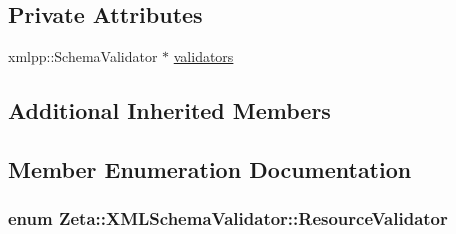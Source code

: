 \subsection*{Private Attributes}
\begin{DoxyCompactItemize}
\item 
xmlpp\+::\+Schema\+Validator $\ast$ \hyperlink{classZeta_1_1XMLSchemaValidator_a6d277476a5378aeba450a080b25ca6f8}{validators}
\end{DoxyCompactItemize}
\subsection*{Additional Inherited Members}


\subsection{Member Enumeration Documentation}
\hypertarget{classZeta_1_1XMLSchemaValidator_a61084c788552321105d644d6678c2336}{
\subsubsection[{Resource\+Validator}]{\setlength{\rightskip}{0pt plus 5cm}enum {\bf Zeta\+::\+X\+M\+L\+Schema\+Validator\+::\+Resource\+Validator}\hspace{0.3cm}{\ttfamily [strong]}}}\label{classZeta_1_1XMLSchemaValidator_a61084c788552321105d644d6678c2336}
